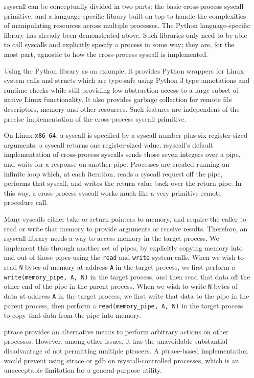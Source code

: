 \documentclass{acmart}
\begin{document}
rsyscall can be conceptually divided in two parts:
the basic cross-process syscall primitive,
and a language-specific library built on top
to handle the complexities of manipulating resources across multiple processes.
The Python language-specific library has already been demonstrated above.
Such libraries only need to be able to call syscalls and explicitly specify a process in some way;
they are, for the most part, agnostic to how the cross-process syscall is implemented.

Using the Python library as an example,
it provides Python wrappers for Linux system calls and structs
which are type-safe using Python 3 type annotations and runtime checks
while still providing low-abstraction access to a large subset of native Linux functionality.
It also provides garbage collection for remote file descriptors, memory and other resources.
Such features are independent of the precise implementation of the cross-process syscall primitive.

On Linux \verb|x86_64|, a syscall is specified by a syscall number plus six register-sized arguments;
a syscall returns one register-sized value.
rsyscall's default implementation of cross-process syscalls sends those seven integers over a pipe,
and waits for a response on another pipe.
Processes are created running an infinite loop which, at each iteration,
reads a syscall request off the pipe,
performs that syscall,
and writes the return value back over the return pipe.
In this way, a cross-process syscall works much like a very primitive remote procedure call.

Many syscalls either take or return pointers to memory,
and require the caller to read or write that memory to provide arguments or receive results.
Therefore, an rsyscall library needs a way to access memory in the target process.
We implement this through another set of pipes,
by explicitly copying memory into and out of those pipes using the \texttt{read} and \texttt{write} system calls.
When we wish to read \texttt{N} bytes of memory at address \texttt{A} in the target process,
we first perform a \verb|write(memory_pipe, A, N)| in the target process,
and then read that data off the other end of the pipe in the parent process.
When we wish to write \texttt{N} bytes of data at address \texttt{A} in the target process,
we first write that data to the pipe in the parent process,
then perform a \verb|read(memory_pipe, A, N)| in the target process to copy that data from the pipe into memory.

ptrace provides an alternative means to perform arbitrary actions on other processes.
However, among other issues, it has the unavoidable substantial disadvantage of not permitting multiple ptracers.
A ptrace-based implementation would prevent using strace or gdb on rsyscall-controlled processes,
which is an unacceptable limitation for a general-purpose utility.
\end{document}
